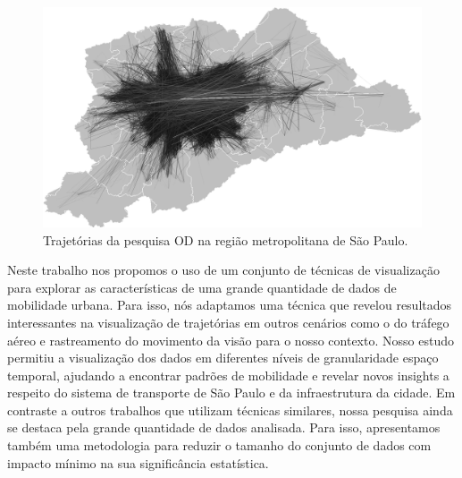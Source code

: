 \begin{figure}[!htb]
  \centering
  \includegraphics[width=150mm]{../figuras/unbundled-edges+grayscale+512px.png}
  \caption[Trajetórias da pesquisa OD na região metropolitana de S\~ao Paulo]{Trajetórias da pesquisa
OD na região metropolitana de S\~ao Paulo. \label{fig:cluttered-graph}}
  
\end{figure}

Neste trabalho nos propomos o uso de um conjunto de técnicas de visualização
para explorar as características de uma grande quantidade de dados de
mobilidade urbana. Para isso, nós adaptamos uma técnica que revelou resultados
interessantes na visualização de trajetórias em outros cenários como o do
tráfego aéreo e rastreamento do movimento da visão para o nosso contexto.
Nosso estudo permitiu a visualização dos dados em diferentes níveis de
granularidade espaço temporal, ajudando a encontrar padrões de mobilidade e
revelar novos insights a respeito do sistema de transporte de S\~ao Paulo e da
infraestrutura da cidade. Em contraste a outros trabalhos que utilizam técnicas
similares, nossa pesquisa ainda se destaca pela grande quantidade de dados
analisada. Para isso, apresentamos também uma metodologia para reduzir o tamanho
do conjunto de dados com impacto mínimo na sua significância estatística. 
